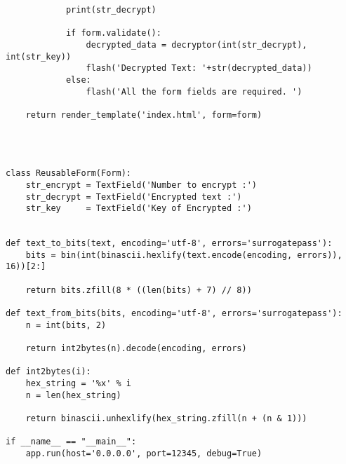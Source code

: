 \documentclass[a4paper]{article}
\begin{document}
\begin{verbatim}
            print(str_decrypt)
     
            if form.validate():
                decrypted_data = decryptor(int(str_decrypt), int(str_key))
                flash('Decrypted Text: '+str(decrypted_data))
            else:
                flash('All the form fields are required. ')             
 
    return render_template('index.html', form=form)




class ReusableForm(Form):
    str_encrypt = TextField('Number to encrypt :')
    str_decrypt = TextField('Encrypted text :')
    str_key     = TextField('Key of Encrypted :')


def text_to_bits(text, encoding='utf-8', errors='surrogatepass'):
    bits = bin(int(binascii.hexlify(text.encode(encoding, errors)), 16))[2:]
    
    return bits.zfill(8 * ((len(bits) + 7) // 8))

def text_from_bits(bits, encoding='utf-8', errors='surrogatepass'):
    n = int(bits, 2)
    
    return int2bytes(n).decode(encoding, errors)

def int2bytes(i):
    hex_string = '%x' % i
    n = len(hex_string)
    
    return binascii.unhexlify(hex_string.zfill(n + (n & 1)))

if __name__ == "__main__":
    app.run(host='0.0.0.0', port=12345, debug=True)
\end{verbatim}
\end{document}
